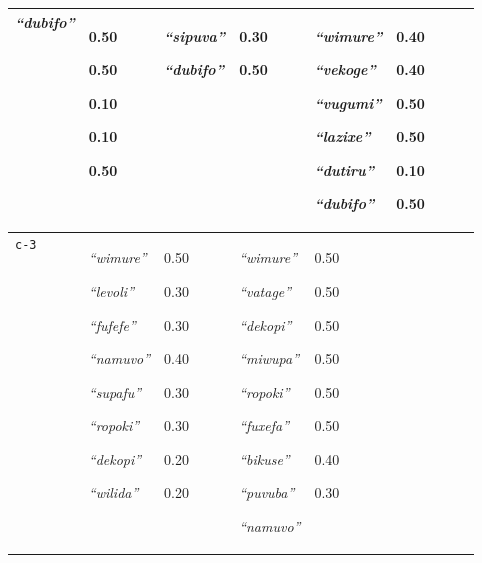 {\begin{tabular}{@{}p{1.2cm}|p{1.6cm}@{}p{0.8cm}@{}|p{1.6cm}@{}p{0.8cm}@{}|p{1.6cm}@{}p{0.8cm}@{}|p{1.6cm}@{}p{0.8cm}@{}}
\textit{``dubifo''}
&0.50

0.50

0.10

0.10

0.50&\textit{``sipuva''}


\textit{``dubifo''}
&0.30

0.50&\textit{``wimure''}


\textit{``vekoge''}


\textit{``vugumi''}


\textit{``lazixe''}


\textit{``dutiru''}


\textit{``dubifo''}
&0.40

0.40

0.50

0.50

0.10

0.50\\
\hline
\texttt{c-3}&\textit{``wimure''}


\textit{``levoli''}


\textit{``fufefe''}


\textit{``namuvo''}


\textit{``supafu''}


\textit{``ropoki''}


\textit{``dekopi''}


\textit{``wilida''}
&0.50

0.30

0.30

0.40

0.30

0.30

0.20

0.20&\textit{``wimure''}


\textit{``vatage''}


\textit{``dekopi''}


\textit{``miwupa''}


\textit{``ropoki''}


\textit{``fuxefa''}


\textit{``bikuse''}


\textit{``puvuba''}


\textit{``namuvo''}
&0.50

0.50

0.50

0.50

0.50

0.50

0.40

0.30


\end{tabular}}
